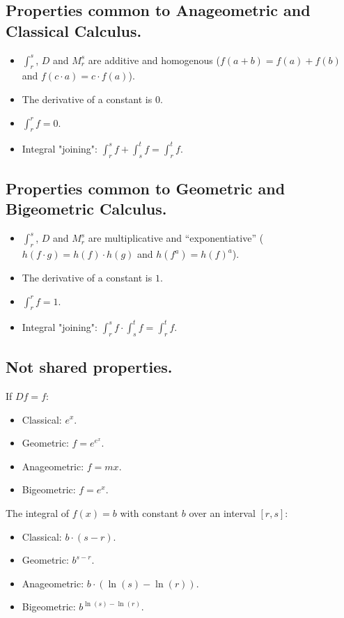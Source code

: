 \newpage

\subsection{Properties common to Anageometric and Classical Calculus.}

\begin{itemize}
	\item $\int_r^s$, $D$ and $M_r^s$ are additive and homogenous ($f(a + b) = f(a) + f(b)$ and $f(c\cdot a) = c\cdot f(a)$).
	\item The derivative of a constant is $0$.
	\item $\int_r^r f = 0$.
	\item Integral "joining": $\int_r^s f + \int_s^t f = \int_r^t f$.
\end{itemize}

\subsection{Properties common to Geometric and Bigeometric Calculus.}

\begin{itemize}
	\item $\int_r^s$, $D$ and $M_r^s$ are multiplicative and \enquote{exponentiative} ($h(f\cdot g) = h(f)\cdot h(g)$ and $h(f^a) = h(f)^a$).
	\item The derivative of a constant is $1$.
	\item $\int_r^r f = 1$.
	\item Integral "joining": $\int_r^s f \cdot \int_s^t f = \int_r^t f$.
\end{itemize}

\subsection{Not shared properties.}

If $Df = f$:

\begin{itemize}
	\item Classical: $e^x$.
	\item Geometric: $f = e^{e^x}$.
	\item Anageometric: $f = mx$.
	\item Bigeometric: $f = e^x$.
\end{itemize}

The integral of $f(x) = b$ with constant $b$ over an interval $[r, s]$:

\begin{itemize}
	\item Classical: $b \cdot (s - r)$.
	\item Geometric: $b^{s-r}$.
	\item Anageometric: $b \cdot (\ln(s) - \ln(r))$.
	\item Bigeometric: $b^{\ln(s) - \ln(r)}$.
\end{itemize}


